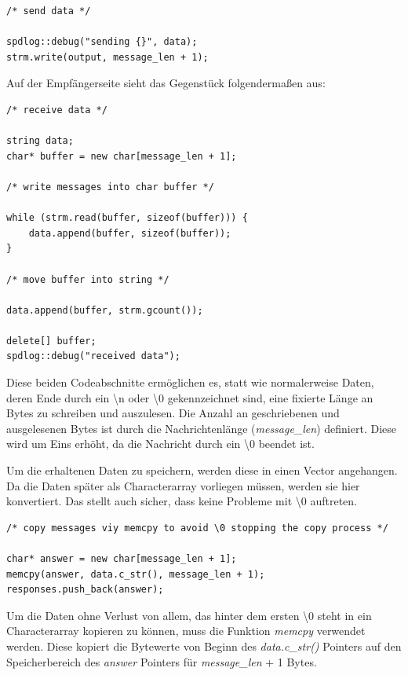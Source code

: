 \documentclass[]{article}
\begin{document}
\begin{lstlisting}
/* send data */

spdlog::debug("sending {}", data);
strm.write(output, message_len + 1);
\end{lstlisting}

Auf der Empfängerseite sieht das Gegenstück folgendermaßen aus:

\begin{lstlisting}
/* receive data */

string data;
char* buffer = new char[message_len + 1];

/* write messages into char buffer */

while (strm.read(buffer, sizeof(buffer))) {
	data.append(buffer, sizeof(buffer));
}

/* move buffer into string */

data.append(buffer, strm.gcount());

delete[] buffer;
spdlog::debug("received data");
\end{lstlisting}

Diese beiden Codeabschnitte ermöglichen es, statt wie normalerweise Daten, deren Ende durch ein \textbackslash n oder \textbackslash 0 gekennzeichnet sind, eine fixierte Länge an Bytes zu schreiben und auszulesen. Die Anzahl an geschriebenen und ausgelesenen Bytes ist durch die Nachrichtenlänge (\textit{message\_len}) definiert. Diese wird um Eins erhöht, da die Nachricht durch ein \textbackslash 0 beendet ist.

Um die erhaltenen Daten zu speichern, werden diese in einen Vector angehangen. Da die Daten später als Characterarray vorliegen müssen, werden sie hier konvertiert. Das stellt auch sicher, dass keine Probleme mit \textbackslash 0 auftreten.

\begin{lstlisting}
/* copy messages viy memcpy to avoid \0 stopping the copy process */

char* answer = new char[message_len + 1];
memcpy(answer, data.c_str(), message_len + 1);
responses.push_back(answer);
\end{lstlisting}

Um die Daten ohne Verlust von allem, das hinter dem ersten \textbackslash 0 steht in ein Characterarray kopieren zu können, muss die Funktion \textit{memcpy} verwendet werden. Diese kopiert die Bytewerte von Beginn des \textit{data.c\_str()} Pointers auf den Speicherbereich des \textit{answer} Pointers für \textit{message\_len} + 1 Bytes.
\end{document}
